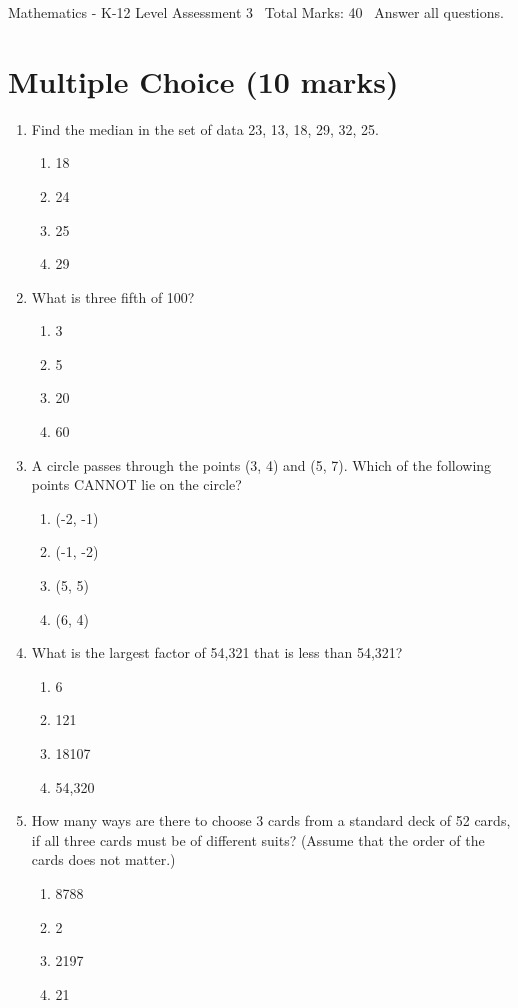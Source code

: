 \documentclass[12pt]{article}
\begin{document}
\begin{center}
Mathematics - K-12 Level Assessment 3 \
Total Marks: 40 \
Answer all questions.
\end{center}

\section*{Multiple Choice (10 marks)}
\begin{enumerate}[label=\arabic*.]
\item Find the median in the set of data 23, 13, 18, 29, 32, 25.
\begin{enumerate}[label=(\alph*)]
    \item 18
    \item 24
    \item 25
    \item 29
\end{enumerate}
\item What is three fifth of 100?
\begin{enumerate}[label=(\alph*)]
    \item 3
    \item 5
    \item 20
    \item 60
\end{enumerate}
\item A circle passes through the points (3, 4) and (5, 7). Which of the following points CANNOT
lie on the circle?
\begin{enumerate}[label=(\alph*)]
    \item (-2, -1)
    \item (-1, -2)
    \item (5, 5)
    \item (6, 4)
\end{enumerate}
\item What is the largest factor of 54,321 that is less than 54,321?
\begin{enumerate}[label=(\alph*)]
    \item 6
    \item 121
    \item 18107
    \item 54,320
\end{enumerate}
\item How many ways are there to choose 3 cards from a standard deck of 52 cards, if all three
cards must be of different suits? (Assume that the order of the cards does not matter.)
\begin{enumerate}[label=(\alph*)]
    \item 8788
    \item 2
    \item 2197
    \item 21
\end{enumerate}
\end{enumerate}
\end{document}
